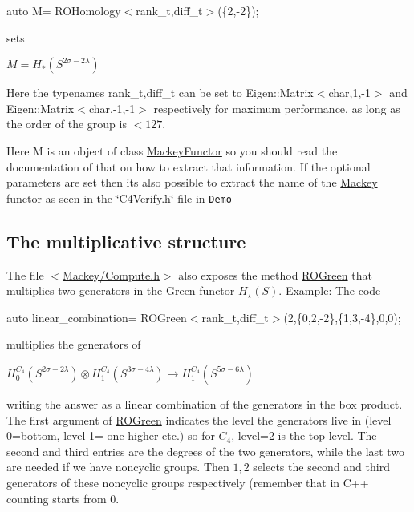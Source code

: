 {\ttfamily  auto M= R\+O\+Homology$<$rank\+\_\+t,diff\+\_\+t$>$(\{2,-\/2\}); }

sets

$ M=H_*(S^{2\sigma-2\lambda})$

Here the typenames {\ttfamily rank\+\_\+t,diff\+\_\+t} can be set to {\ttfamily Eigen\+::\+Matrix$<$char,1,-\/1$>$} and {\ttfamily Eigen\+::\+Matrix$<$char,-\/1,-\/1$>$} respectively for maximum performance, as long as the order of the group is $ <127 $.

Here {\ttfamily M} is an object of class \hyperlink{classMackey_1_1MackeyFunctor}{Mackey\+Functor} so you should read the documentation of that on how to extract that information. If the optional parameters are set then it\textquotesingle{}s also possible to extract the name of the \hyperlink{namespaceMackey}{Mackey} functor as seen in the \char`\"{}\+C4\+Verify.\+h\char`\"{} file in \href{https://github.com/NickG-Math/Mackey/tree/master/Demo}{\tt Demo}\hypertarget{use_step1mult}{}\subsection{The multiplicative structure}\label{use_step1mult}
The file {\ttfamily $<$\hyperlink{Compute_8h}{Mackey/\+Compute.\+h}$>$} also exposes the method \hyperlink{namespaceMackey_a2bd86833844ca62d76c47a54aeb0bb77}{R\+O\+Green} that multiplies two generators in the Green functor $H_{\star}(S)$. Example\+: The code

{\ttfamily auto linear\+\_\+combination= R\+O\+Green$<$rank\+\_\+t,diff\+\_\+t$>$(2,\{0,2,-\/2\},\{1,3,-\/4\},0,0);}

multiplies the generators of

$ H_0^{C_4}(S^{2\sigma-2\lambda}) \otimes H_1^{C_4}(S^{3\sigma-4\lambda}) \to H_1^{C_4}(S^{5\sigma-6\lambda}) $

writing the answer as a linear combination of the generators in the box product. The first argument of \hyperlink{namespaceMackey_a2bd86833844ca62d76c47a54aeb0bb77}{R\+O\+Green} indicates the level the generators live in (level 0=bottom, level 1= one higher etc.) so for $C_4$, level=2 is the top level. The second and third entries are the degrees of the two generators, while the last two are needed if we have noncyclic groups. Then $1,2$ selects the second and third generators of these noncyclic groups respectively (remember that in C++ counting starts from $0$.

